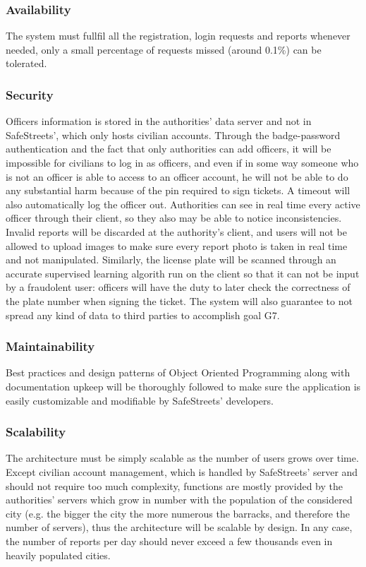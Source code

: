\documentclass[12pt,a4paper]{article}
\begin{document}
\subsubsection{Availability}
The system must fullfil all the registration, login requests and reports whenever needed, only a small percentage of requests missed (around 0.1\%) can be tolerated. 
\subsubsection{Security}
Officers information is stored in the authorities' data server and not in SafeStreets', which only hosts civilian accounts. Through the badge-password authentication and the fact that only authorities can add officers, it will be impossible for civilians to log in as officers, and even if in some way someone who is not an officer is able to access to an officer account, he will not be able to do any substantial harm because of the pin required to sign tickets. A timeout will also automatically log the officer out. Authorities can see in real time every active officer through their client, so they also may be able to notice inconsistencies. Invalid reports will be discarded at the authority's client, and users will not be allowed to upload images to make sure every report photo is taken in real time and not manipulated. Similarly, the license plate will be scanned through an accurate supervised learning algorith run on the client so that it can not be input by a fraudolent user: officers will have the duty to later check the correctness of the plate number when signing the ticket.
The system will also guarantee to not spread any kind of data to third parties to accomplish goal G7.
\subsubsection{Maintainability}
Best practices and design patterns of Object Oriented Programming along with documentation upkeep will be thoroughly followed to make sure the application is easily customizable and modifiable by SafeStreets' developers.
\subsubsection{Scalability}
The architecture must be simply scalable as the number of users grows over time. Except civilian account management, which is handled by SafeStreets' server and should not require too much complexity, functions are mostly provided by the authorities' servers which grow in number with the population of the considered city (e.g. the bigger the city the more numerous the barracks, and therefore the number of servers), thus the architecture will be scalable by design. In any case, the number of reports per day should never exceed a few thousands even in heavily populated cities.
\end{document}
